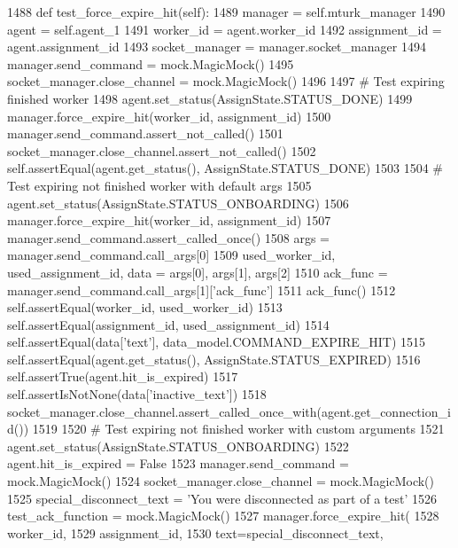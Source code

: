 \begin{DoxyCode}
1488     \textcolor{keyword}{def }test\_force\_expire\_hit(self):
1489         manager = self.mturk\_manager
1490         agent = self.agent\_1
1491         worker\_id = agent.worker\_id
1492         assignment\_id = agent.assignment\_id
1493         socket\_manager = manager.socket\_manager
1494         manager.send\_command = mock.MagicMock()
1495         socket\_manager.close\_channel = mock.MagicMock()
1496 
1497         \textcolor{comment}{# Test expiring finished worker}
1498         agent.set\_status(AssignState.STATUS\_DONE)
1499         manager.force\_expire\_hit(worker\_id, assignment\_id)
1500         manager.send\_command.assert\_not\_called()
1501         socket\_manager.close\_channel.assert\_not\_called()
1502         self.assertEqual(agent.get\_status(), AssignState.STATUS\_DONE)
1503 
1504         \textcolor{comment}{# Test expiring not finished worker with default args}
1505         agent.set\_status(AssignState.STATUS\_ONBOARDING)
1506         manager.force\_expire\_hit(worker\_id, assignment\_id)
1507         manager.send\_command.assert\_called\_once()
1508         args = manager.send\_command.call\_args[0]
1509         used\_worker\_id, used\_assignment\_id, data = args[0], args[1], args[2]
1510         ack\_func = manager.send\_command.call\_args[1][\textcolor{stringliteral}{'ack\_func'}]
1511         ack\_func()
1512         self.assertEqual(worker\_id, used\_worker\_id)
1513         self.assertEqual(assignment\_id, used\_assignment\_id)
1514         self.assertEqual(data[\textcolor{stringliteral}{'text'}], data\_model.COMMAND\_EXPIRE\_HIT)
1515         self.assertEqual(agent.get\_status(), AssignState.STATUS\_EXPIRED)
1516         self.assertTrue(agent.hit\_is\_expired)
1517         self.assertIsNotNone(data[\textcolor{stringliteral}{'inactive\_text'}])
1518         socket\_manager.close\_channel.assert\_called\_once\_with(agent.get\_connection\_id())
1519 
1520         \textcolor{comment}{# Test expiring not finished worker with custom arguments}
1521         agent.set\_status(AssignState.STATUS\_ONBOARDING)
1522         agent.hit\_is\_expired = \textcolor{keyword}{False}
1523         manager.send\_command = mock.MagicMock()
1524         socket\_manager.close\_channel = mock.MagicMock()
1525         special\_disconnect\_text = \textcolor{stringliteral}{'You were disconnected as part of a test'}
1526         test\_ack\_function = mock.MagicMock()
1527         manager.force\_expire\_hit(
1528             worker\_id,
1529             assignment\_id,
1530             text=special\_disconnect\_text,

\end{DoxyCode}
